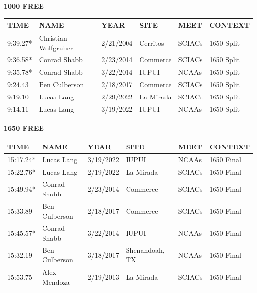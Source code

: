 \begin{table}[H]
\centering
\begin{minipage}[t]{0.48\textwidth}
\centering
\textbf{1000 FREE}\\[0.1cm]
\begin{tabular}{@{}p{1.8cm}p{2.8cm}p{1.2cm}p{1.4cm}p{1.4cm}p{2.0cm}@{}}
\hline
    \textbf{TIME} & \textbf{NAME} & \textbf{YEAR} & \textbf{SITE} & \textbf{MEET} & \textbf{CONTEXT} \\
\hline
    9:39.27* & Christian Wolfgruber & 2/21/2004 & Cerritos & SCIACs & 1650 Split \\
    9:36.58* & Conrad Shabb & 2/23/2014 & Commerce & SCIACs & 1650 Split \\
    9:35.78* & Conrad Shabb & 3/22/2014 & IUPUI & NCAAs & 1650 Split \\
    9:24.43 & Ben Culberson & 2/18/2017 & Commerce & SCIACs & 1650 Split \\
    9:19.10 & Lucas Lang & 2/29/2022 & La Mirada & SCIACs & 1650 Split \\
    9:14.11 & Lucas Lang & 3/19/2022 & IUPUI & NCAAs & 1650 Split \\
\hline
\end{tabular}
\end{minipage}\hfill
\begin{minipage}[t]{0.48\textwidth}
\centering
\textbf{1650 FREE}\\[0.1cm]
\begin{tabular}{@{}p{1.8cm}p{2.8cm}p{1.2cm}p{1.4cm}p{1.4cm}p{2.0cm}@{}}
\hline
    \textbf{TIME} & \textbf{NAME} & \textbf{YEAR} & \textbf{SITE} & \textbf{MEET} & \textbf{CONTEXT} \\
\hline
    15:17.24* & Lucas Lang & 3/19/2022 & IUPUI & NCAAs & 1650 Final \\
    15:22.76* & Lucas Lang & 2/19/2022 & La Mirada & SCIACs & 1650 Final \\
    15:49.94* & Conrad Shabb & 2/23/2014 & Commerce & SCIACs & 1650 Final \\
    15:33.89 & Ben Culberson & 2/18/2017 & Commerce & SCIACs & 1650 Final \\
    15:45.57* & Conrad Shabb & 3/22/2014 & IUPUI & NCAAs & 1650 Final \\
    15:32.19 & Ben Culberson & 3/18/2017 & Shenandoah, TX & NCAAs & 1650 Final \\
    15:53.75 & Alex Mendoza & 2/19/2013 & La Mirada & SCIACs & 1650 Final \\
\hline
\end{tabular}
\end{minipage}
\end{table}

